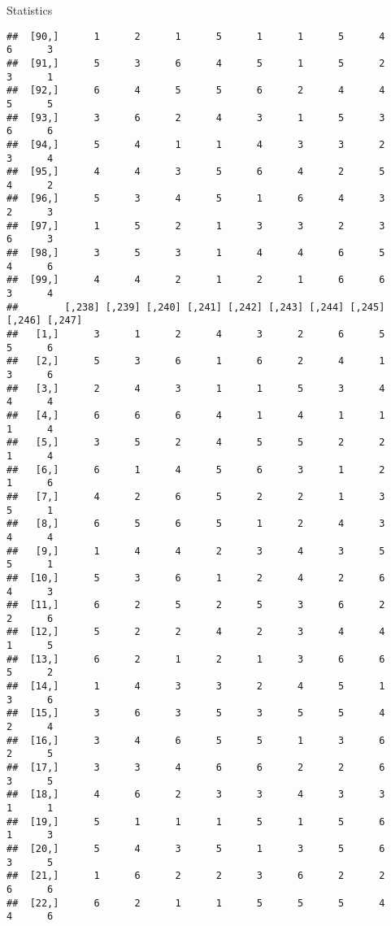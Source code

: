 \documentclass[
  ignorenonframetext,
]{beamer}
\begin{document}
\begin{frame}[fragile]{Statistics}
\begin{verbatim}
##  [90,]      1      2      1      5      1      1      5      4      6      3
##  [91,]      5      3      6      4      5      1      5      2      3      1
##  [92,]      6      4      5      5      6      2      4      4      5      5
##  [93,]      3      6      2      4      3      1      5      3      6      6
##  [94,]      5      4      1      1      4      3      3      2      3      4
##  [95,]      4      4      3      5      6      4      2      5      4      2
##  [96,]      5      3      4      5      1      6      4      3      2      3
##  [97,]      1      5      2      1      3      3      2      3      6      3
##  [98,]      3      5      3      1      4      4      6      5      4      6
##  [99,]      4      4      2      1      2      1      6      6      3      4
##        [,238] [,239] [,240] [,241] [,242] [,243] [,244] [,245] [,246] [,247]
##   [1,]      3      1      2      4      3      2      6      5      5      6
##   [2,]      5      3      6      1      6      2      4      1      3      6
##   [3,]      2      4      3      1      1      5      3      4      4      4
##   [4,]      6      6      6      4      1      4      1      1      1      4
##   [5,]      3      5      2      4      5      5      2      2      1      4
##   [6,]      6      1      4      5      6      3      1      2      1      6
##   [7,]      4      2      6      5      2      2      1      3      5      1
##   [8,]      6      5      6      5      1      2      4      3      4      4
##   [9,]      1      4      4      2      3      4      3      5      5      1
##  [10,]      5      3      6      1      2      4      2      6      4      3
##  [11,]      6      2      5      2      5      3      6      2      2      6
##  [12,]      5      2      2      4      2      3      4      4      1      5
##  [13,]      6      2      1      2      1      3      6      6      5      2
##  [14,]      1      4      3      3      2      4      5      1      3      6
##  [15,]      3      6      3      5      3      5      5      4      2      4
##  [16,]      3      4      6      5      5      1      3      6      2      5
##  [17,]      3      3      4      6      6      2      2      6      3      5
##  [18,]      4      6      2      3      3      4      3      3      1      1
##  [19,]      5      1      1      1      5      1      5      6      1      3
##  [20,]      5      4      3      5      1      3      5      6      3      5
##  [21,]      1      6      2      2      3      6      2      2      6      6
##  [22,]      6      2      1      1      5      5      5      4      4      6

\end{verbatim}
\end{frame}
\end{document}
